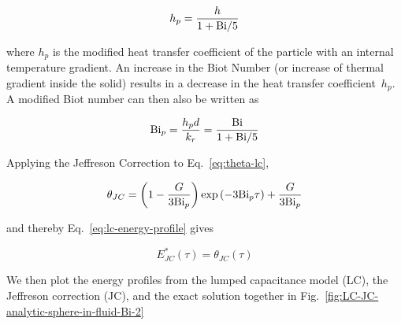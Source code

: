 \begin{equation}
	h_{p}=\frac{h}{1+\mathrm{Bi}/5}
\end{equation}

where $h_p$ is the modified heat transfer coefficient of the particle with an internal temperature gradient.  An increase in the Biot Number (or increase of thermal gradient inside the solid) results in a decrease in the heat transfer coefficient~$h_p$. A modified Biot number can then also be written as

\begin{equation}\label{eq:jeffreson-correction-bip}
	\mathrm{Bi}_p = \frac{h_p d}{k_r} = \frac{\mathrm{Bi}}{1+\mathrm{Bi}/5}
\end{equation}

Applying the Jeffreson Correction to Eq.~\ref{eq:theta-lc},

\begin{equation}
\label{eq:theta-jc-bip}
	\theta_{JC}=\left(1-\frac{G}{3\mathrm{Bi}_p}\right)\exp\left(-3\mathrm{Bi}_p \tau\right) + \frac{G}{3\mathrm{Bi}_p}
\end{equation}

and thereby Eq.~\ref{eq:lc-energy-profile} gives

\begin{equation}\label{eq:jc-energy-profile}
	E^*_{JC}(\tau) = \theta_{JC}(\tau)
\end{equation}

We then plot the energy profiles from the lumped capacitance model (LC), the Jeffreson correction (JC), and the exact solution together in Fig.~\ref{fig:LC-JC-analytic-sphere-in-fluid-Bi-2}

